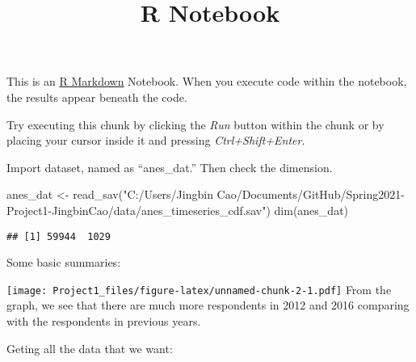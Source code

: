 \documentclass[
]{article}
\title{R Notebook}
\author{}
\date{\vspace{-2.5em}}
\newenvironment{Shaded}{\begin{snugshade}}{\end{snugshade}}
\newcommand{\AttributeTok}[1]{\textcolor[rgb]{0.77,0.63,0.00}{#1}}
\newcommand{\DecValTok}[1]{\textcolor[rgb]{0.00,0.00,0.81}{#1}}
\newcommand{\FunctionTok}[1]{\textcolor[rgb]{0.00,0.00,0.00}{#1}}
\newcommand{\NormalTok}[1]{#1}
\newcommand{\OtherTok}[1]{\textcolor[rgb]{0.56,0.35,0.01}{#1}}
\newcommand{\SpecialCharTok}[1]{\textcolor[rgb]{0.00,0.00,0.00}{#1}}
\newcommand{\StringTok}[1]{\textcolor[rgb]{0.31,0.60,0.02}{#1}}
\begin{document}
\maketitle

This is an \href{http://rmarkdown.rstudio.com}{R Markdown} Notebook.
When you execute code within the notebook, the results appear beneath
the code.

Try executing this chunk by clicking the \emph{Run} button within the
chunk or by placing your cursor inside it and pressing
\emph{Ctrl+Shift+Enter}.

Import dataset, named as ``anes\_dat.'' Then check the dimension.

\begin{Shaded}
\begin{Highlighting}[]
\NormalTok{anes\_dat }\OtherTok{\textless{}{-}} 
  \FunctionTok{read\_sav}\NormalTok{(}\StringTok{"C:/Users/Jingbin Cao/Documents/GitHub/Spring2021{-}Project1{-}JingbinCao/data/anes\_timeseries\_cdf.sav"}\NormalTok{)}
\FunctionTok{dim}\NormalTok{(anes\_dat)}
\end{Highlighting}
\end{Shaded}

\begin{verbatim}
## [1] 59944  1029
\end{verbatim}

Some basic summaries:

\begin{Shaded}
\end{Shaded}

\texttt{[image: Project1\_files/figure-latex/unnamed-chunk-2-1.pdf]} From
the graph, we see that there are much more respondents in 2012 and 2016
comparing with the respondents in previous years.

Geting all the data that we want:
\end{document}

